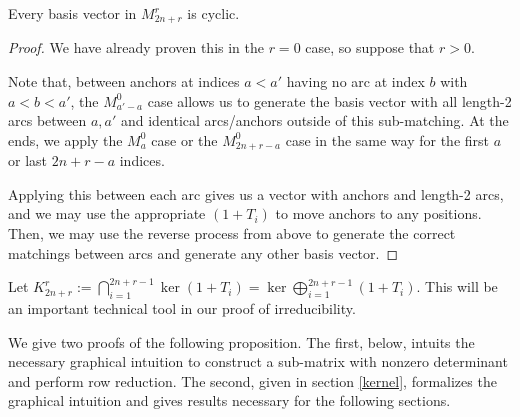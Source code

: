 \documentclass{amsart}
\begin{document}
\begin{lemma}
  \label{Cyclic}
  Every basis vector in $M_{2n + r}^r$ is cyclic.
\end{lemma}
\begin{proof}
  We have already proven this in the $r = 0$ case, so suppose that $r > 0$.

  Note that, between anchors at indices $a<a'$ having no arc at index $b$ with $a < b < a'$, the $M_{a'-a}^0$ case allows us to generate the basis vector with all length-2 arcs between $a,a'$ and identical arcs/anchors outside of this sub-matching.
  At the ends, we apply the $M_a^0$ case or the $M_{2n + r - a}^{0}$ case in the same way for the first $a$ or last $2n + r - a$ indices.

  Applying this between each arc gives us a vector with anchors and length-2 arcs, and we may use the appropriate $(1+T_i)$ to move anchors to any positions.
  Then, we may use the reverse process from above to generate the correct matchings between arcs and generate any other basis vector.
\end{proof}

Let $K_{2n+r}^r := \bigcap_{i=1}^{2n+r-1} \ker (1 + T_i) = \ker \bigoplus_{i = 1}^{2n + r - 1} (1 + T_i)$.
This will be an important technical tool in our proof of irreducibility. 

We give two proofs of the following proposition. The first, below, intuits the necessary graphical intuition to construct a sub-matrix with nonzero determinant and perform row reduction. The second, given in section \ref{kernel}, formalizes the graphical intuition and gives results necessary for the following sections.
\end{document}

